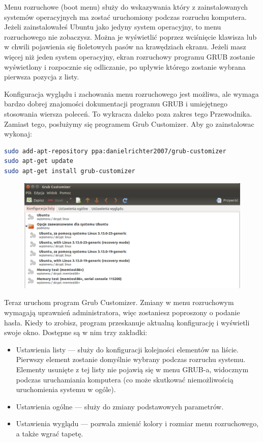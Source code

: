 Menu rozruchowe (boot menu) służy do wskazywania który z zainstalowanych systemów operacyjnych ma zostać uruchomiony podczas rozruchu komputera. Jeżeli zainstalowałeś Ubuntu jako jedyny system operacyjny, to menu rozruchowego nie zobaczysz. Można je wyświetlić poprzez wciśnięcie klawisza  lub \keys{\arrowkeydown} w chwili pojawienia się fioletowych pasów na krawędziach ekranu. Jeżeli masz więcej niż jeden system operacyjny, ekran rozruchowy programu GRUB zostanie wyświetlony i rozpocznie się odliczanie, po upływie którego zostanie wybrana pierwsza pozycja z listy.

Konfiguracja wyglądu i zachowania menu rozruchowego jest możliwa, ale wymaga bardzo dobrej znajomości dokumentacji programu GRUB i umiejętnego stosowania wiersza poleceń. To wykracza daleko poza zakres tego Przewodnika. Zamiast tego, posłużymy się programem \textcolor{ubuntu_orange}{Grub Customizer}. Aby go zainstalowac wykonaj:
\begin{lstlisting}[language=bash]
sudo add-apt-repository ppa:danielrichter2007/grub-customizer
sudo apt-get update
sudo apt-get install grub-customizer
\end{lstlisting}

\begin{figure}
	\vspace{-10pt}
	\includegraphics[width=\linewidth]{images/programy_grub_customizer.png}
\end{figure}

Teraz uruchom program Grub Customizer. Zmiany w menu rozruchowym wymagają uprawnień administratora, więc zostaniesz poproszony o podanie hasła. Kiedy to zrobisz, program przeskanuje aktualną konfigurację i wyświetli swoje okno. Dostępne są w nim trzy zakładki:
\vspace{0.1cm}
\begin{itemize}
\item \textcolor{ubuntu_orange}{Ustawienia listy} --- służy do konfiguracji kolejności elementów na liście. Pierwszy element zostanie domyślnie wybrany podczas rozruchu systemu. Elementy usunięte z tej listy nie pojawią się w menu GRUB-a, widocznym podczas uruchamiania komputera (co może skutkować niemożliwością uruchomienia systemu w ogóle).
\item \textcolor{ubuntu_orange}{Ustawienia ogólne} --- służy do zmiany podstawowych parametrów.
\item \textcolor{ubuntu_orange}{Ustawienia wyglądu} --- pozwala zmienić kolory i rozmiar menu rozruchowego, a także wgrać tapetę.
\end{itemize}

